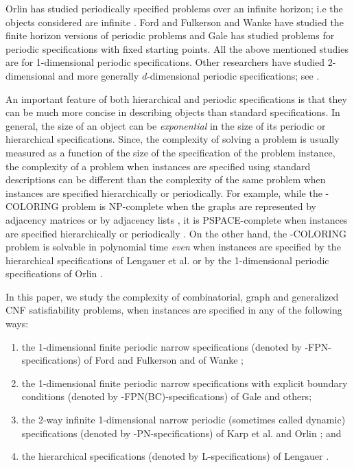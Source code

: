 Orlin has studied periodically specified problems over an infinite 
horizon; i.e the objects considered are infinite \cite{Or82a}. 
Ford and Fulkerson \cite{FF58} and Wanke \cite{Wa93} have 
studied the finite horizon
versions of periodic problems and Gale \cite{Ga59} has studied problems for
periodic specifications with fixed starting points. All the above mentioned
studies are for 1-dimensional periodic specifications.
Other 
researchers have studied 2-dimensional and more generally $d$-dimensional
periodic specifications; 
see \cite{drucker2019cyclic,ho2015cyclic,CM91,IS87,KO91,KS88,Wa93}. 

An important feature of  both hierarchical and periodic 
specifications is that they
can be much  more concise in describing  objects than standard  specifications.
In general, the size of an object can be \emph{exponential} in the
size of its periodic or hierarchical specifications.
Since, the  complexity of solving a problem 
is usually measured as a function of the size of the specification of the 
problem instance,  
the complexity of a problem when instances are specified using
standard descriptions can
be  different than the complexity of the same problem 
when instances are specified hierarchically or periodically.
For example, while the {-COLORING} problem is 
{\sf NP-}complete when the graphs are represented by adjacency matrices
or by adjacency lists \cite{GJ79}, it is 
{\sf PSPACE}-complete when instances are specified
hierarchically or periodically \cite{LW92,Or84b}.
On the other hand, the {-COLORING} problem is solvable in polynomial time
{\em even} when instances are specified by the hierarchical
specifications of Lengauer et al. \cite{LW92,LW87a} or by  the 
1-dimensional periodic specifications of Orlin \cite{Or82a}.




In this paper, we study the complexity of combinatorial, graph and 
generalized {\sf CNF} satisfiability problems,
when instances are specified in any of the following ways:

\begin{enumerate}
\item
the 1-dimensional finite periodic narrow specifications (denoted by
{-FPN}-specifications) of Ford and Fulkerson \cite{FF58}
and of Wanke \cite{Wa93}; 
\item
the 1-dimensional finite periodic narrow specifications with explicit 
boundary conditions (denoted by {-FPN(BC)}-specifications)
of Gale \cite{Ga59} and others; 
\item
the 2-way infinite 1-dimensional narrow
periodic (sometimes called dynamic) specifications  (denoted by
{-PN}-specifications) 
of Karp et al. and Orlin \cite{KMW67,Or82a}; and 
\item
the hierarchical specifications (denoted by {\sf L}-specifications) of 
Lengauer \cite{LW87a}. 
\end{enumerate}

